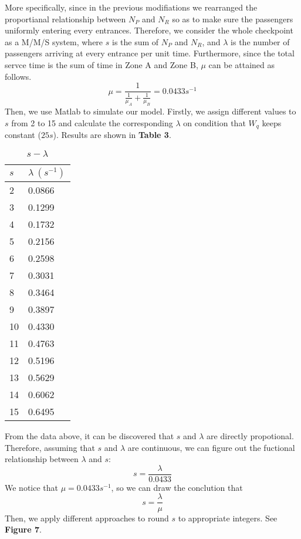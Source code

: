 \documentclass{mcmthesis}
\begin{document}
More specifically, since in the previous modifiations we rearranged the proportianal relationship between $N_P$ and $N_R$ so as to make sure the passengers uniformly entering every entrances. Therefore, we consider the whole checkpoint as a M/M/S system, where $s$ is the sum of $N_P$ and $N_R$, and $\lambda$ is the number of passengers  arriving at every entrance per unit time. Furthermore, since the total servce time is the sum of time in Zone A and Zone B, $\mu$ can be attained as follows.
$$\mu=\frac{1}{\frac{1}{\mu_A}+\frac{1}{\mu_B}}=0.0433s^{-1}$$
Then, we use Matlab to simulate our model. Firstly, we assign different values to $s$ from 2 to 15 and calculate the corresponding $\lambda$ on condition that $W_q$ keeps constant ($25s$). Results are shown in \textbf{Table 3}.

\begin{table}[htbp]
\centering
\begin{tabular}{m{4cm}<{\centering}m{4cm}<{\centering}}
\toprule
\textbf{$s$}&\textbf{$\lambda\ (s^{-1})$}\\
\midrule
2&0.0866\\

3&0.1299\\

4&0.1732\\

5&0.2156\\

6&0.2598\\

7&0.3031\\

8&0.3464\\

9&0.3897\\

10&0.4330\\ 

11&0.4763\\ 

12&0.5196\\

13&0.5629\\

14&0.6062\\
 
15&0.6495\\
\bottomrule
\end{tabular}
\caption{$s-\lambda$}\label{tab:Data}
\end{table}
From the data above, it can be discovered that $s$ and $\lambda$ are directly propotional. Therefore, assuming that $s$ and $\lambda$ are continuous, we can figure out the fuctional relationship between $\lambda$ and $s$:
$$s=\frac{\lambda}{0.0433}$$
We notice that $\mu=0.0433s^{-1}$, so we can draw the conclution that
$$s=\frac{\lambda}{\mu}$$
Then, we apply different approaches to round $s$ to appropriate integers. See \textbf{Figure 7}.
\end{document}
